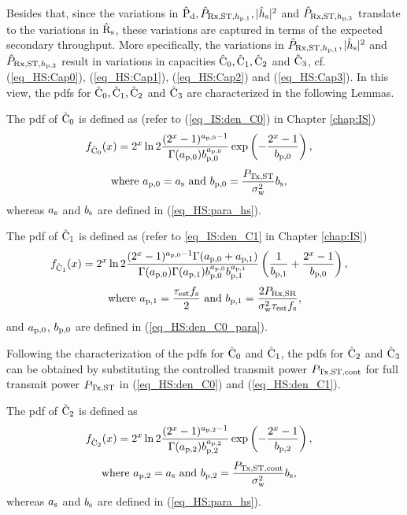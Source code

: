 Besides that, since the variations in $\hat{\text{P}}_{\text{d}}, \hat{P}_{\text{Rx,ST,$h_{\text{p,1}}$}}, |\hat{h}_{\text{s}}|^2$ and $\hat{P}_{\text{Rx,ST,$h_{\text{p,3}}$}}$ translate to the variations in $\hat{\text{{R}}}_{\text{s}}$, these variations are captured in terms of the expected secondary throughput. More specifically, the variations in $\hat{P}_{\text{Rx,ST,$h_{\text{p,1}}$}}, |\hat{h}_{\text{s}}|^2$ and $\hat{P}_{\text{Rx,ST,$h_{\text{p,3}}$}}$ result in variations in capacities $\hat{\text{C}}_{\text{0}}, \hat{\text{C}}_{\text{1}}, \hat{\text{C}}_{\text{2}}$ and $\hat{\text{C}}_{\text{3}}$, cf. (\ref{eq_HS:Cap0}), (\ref{eq_HS:Cap1}), (\ref{eq_HS:Cap2}) and (\ref{eq_HS:Cap3}). In this view, the pdfs for $\hat{\text{C}}_{\text{0}}, \hat{\text{C}}_{\text{1}}, \hat{\text{C}}_{\text{2}}$ and $\hat{\text{C}}_{\text{3}}$ are characterized in the following Lemmas.
\begin{lemma} \label{lm_HS:lem3}
\normalfont
The pdf of $\hat{\text{C}}_{\text{0}}$ is defined as (refer to (\ref{eq_IS:den_C0}) in Chapter \ref{chap:IS}) 
\begin{align}
f_{\hat{\text{C}}_{\text{0}}}(x) &= 2^x \ln 2 \frac{(2^x - 1)^{a_{\text{p,0}} - 1}}{\Gamma(a_{\text{p,0}}) b_{\text{p,0}}^{a_{\text{p,0}}}} \exp\left(-\frac{2^x - 1}{b_{\text{p,0}}}\right),  \label{eq_HS:den_C0}
\end{align}
\begin{align}
\text{where  } a_{\text{p,0}} = a_{\text{s}} &\text{ and } b_{\text{p,0}} = \frac{P_{\text{Tx,ST}}}{\sigma^2_{\text{w}}} b_{\text{s}},  \label{eq_HS:den_C0_para} 
\end{align}
whereas $a_{\text{s}}$ and $b_{\text{s}}$ are defined in (\ref{eq_HS:para_hs}).
\end{lemma}

\begin{lemma} \label{lm_HS:lem4} 
\normalfont
The pdf of $\hat{\text{C}}_{\text{1}}$ is defined as (refer to \ref{eq_IS:den_C1} in Chapter \ref{chap:IS})  
\begin{align}
f_{\hat{\text{C}}_{\text{1}}}(x) &= 2^x \ln 2 \frac{(2^x - 1)^{a_{\text{p,0}} - 1} \Gamma(a_{\text{p,0}} + a_{\text{p,1}})}{\Gamma(a_{\text{p,0}}) \Gamma(a_{\text{p,1}}) b_{\text{p,0}}^{a_{\text{p,0}}} b_{\text{p,1}}^{a_{\text{p,1}}}} \left(\frac{1}{b_{\text{p,1}}} + \frac{2^x - 1}{b_{\text{p,0}}}\right), \label{eq_HS:den_C1}
\end{align}
\begin{align}
\text{where  } a_{\text{p,1}} = \frac{\tau_{\text{est}} f_{\text{s}}}{2}  \text{  and  } b_{\text{p,1}} = \frac{2 P_{\text{Rx,SR}}}{\sigma^2_{\text{w}} \tau_{\text{est}} f_{\text{s}}}, \label{eq_HS:den_C1_para} 
\end{align}
and $a_{\text{p,0}}$, $b_{\text{p,0}}$ are defined in (\ref{eq_HS:den_C0_para}).
\end{lemma}
Following the characterization of the pdfs for $\hat{\text{C}}_{\text{0}}$ and $\hat{\text{C}}_{\text{1}}$, the pdfs for $\hat{\text{C}}_{\text{2}}$ and $\hat{\text{C}}_{\text{3}}$ can be obtained by substituting the controlled transmit power $P_{\text{Tx,ST,cont}}$ for full transmit power $P_{\text{Tx,ST}}$ in (\ref{eq_HS:den_C0}) and (\ref{eq_HS:den_C1}).
\begin{lemma} \label{lm_HS:lem5}
\normalfont
The pdf of $\hat{\text{C}}_{\text{2}}$ is defined as
\begin{align}
f_{\hat{\text{C}}_{\text{2}}}(x) &= 2^x \ln 2 \frac{(2^x - 1)^{a_{\text{p,2}} - 1}}{\Gamma(a_{\text{p,2}}) b_{\text{p,2}}^{a_{\text{p,2}}}} \exp\left(-\frac{2^x - 1}{b_{\text{p,2}}}\right),  \label{eq_HS:den_C2}
\end{align}
\begin{align}
\text{where  } a_{\text{p,2}} = a_{\text{s}} &\text{ and } b_{\text{p,2}} = \frac{P_{\text{Tx,ST,cont}}}{\sigma^2_{\text{w}}} b_{\text{s}},  \label{eq_HS:den_C2_para} 
\end{align}
whereas $a_{\text{s}}$ and $b_{\text{s}}$ are defined in (\ref{eq_HS:para_hs}).
\end{lemma}

